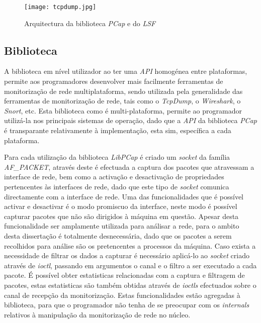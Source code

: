 \begin{figure}[htbp]
       \centering
       \texttt{[image: tcpdump.jpg]}
       \caption{Arquitectura da biblioteca \textit{PCap} e do \textit{LSF}}
      \label{fig:pcap_architecture2}
\end{figure}

\subsection{Biblioteca}

A biblioteca em nível utilizador ao ter uma \textit{API} homogénea entre plataformas, permite aos programadores desenvolver mais facilmente ferramentas de monitorização de rede multiplataforma, sendo utilizada pela generalidade das ferramentas de monitorização de rede, tais como o \textit{TcpDump}, o \textit{Wireshark}, o \textit{Snort}, etc.
Esta biblioteca como é multi-plataforma, permite ao programador utilizá-la nos principais sistemas de operação, dado que a \textit{API} da biblioteca \textit{PCap} é transparante relativamente à implementação, esta sim, específica a cada plataforma.

Para cada utilização da biblioteca \textit{LibPCap} é criado um \textit{socket} da família \textit{AF\_PACKET}, através deste é efectuada a captura dos pacotes que atravessam a interface de rede, bem como a activação e desactivação de propriedades pertencentes às interfaces de rede, dado que este tipo de \textit{socket} comunica directamente com a interface de rede.
Uma das funcionalidades que é possível activar e desactivar é o modo promiscuo da interface, neste modo é possível capturar pacotes que não são dirigidos à máquina em questão.
Apesar desta funcionalidade ser amplamente utilizada para análisar a rede, para o ambito desta dissertação é totalmente desnecessária, dado que os pacotes a serem recolhidos para análise são os pretencentes a processos da máquina.
Caso exista a necessidade de filtrar os dados a capturar é necessário aplicá-lo ao \textit{socket} criado através de \textit{ioctl}, passando em argumentos o canal e o filtro a ser executado a cada pacote.
É possível obter estatisticas relacionadas com a captura e filtragem de pacotes, estas estatisticas são também obtidas através de \textit{ioctls} efectuados sobre o canal de recepção da monitorização.
Estas funcionalidades estão agregadas à biblioteca, para que o programador não tenha de se preocupar com os \textit{internals} relativos à manipulação da monitorização de rede no núcleo.


